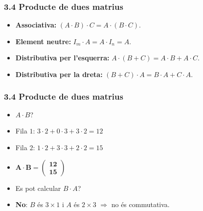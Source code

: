 \documentclass[aspectratio=169]{beamer}
\newcommand{\solucio}[1]{{\color{margueVerdFosc}\ensuremath{\mathbf{#1}}}}
\begin{document}
\begin{frame}[t]
  \frametitle{3.4 Producte de dues matrius}

  \vspace{-0.28cm}
  \begin{itemize}
    \item<1-> \textbf{Associativa:} $(A \cdot B) \cdot C = A \cdot (B \cdot C)$.
    \item<2-> \textbf{Element neutre:} $I_m \cdot A = A \cdot I_n = A$.
    \item<3-> \textbf{Distributiva per l'esquerra:} $A \cdot (B + C) = A \cdot B + A \cdot C$.
    \item<4-> \textbf{Distributiva per la dreta:} $(B + C) \cdot A = B \cdot A + C \cdot A$.
  \end{itemize}
\end{frame}

\begin{frame}[t]
  \frametitle{3.4 Producte de dues matrius}

  \vspace{-0.28cm}
  \begin{itemize}
    \item<2-> $A \cdot B$?
    \item<3-> Fila $1$: $3 \cdot 2 + 0 \cdot 3 + 3 \cdot 2 = 12$
    \item<4-> Fila $2$: $1 \cdot 2 + 3 \cdot 3 + 2 \cdot 2 = 15$
    \item<5-> \solucio{A \cdot B = \begin{pmatrix} 12 \\ 15 \end{pmatrix}}
    \item<6-> Es pot calcular $B \cdot A$?
    \item<7-> \textbf{No}: $B$ és $3 \times 1$ i $A$ és $2 \times 3$ $\Rightarrow$ no és commutativa.
  \end{itemize}
\end{frame}
\end{document}
